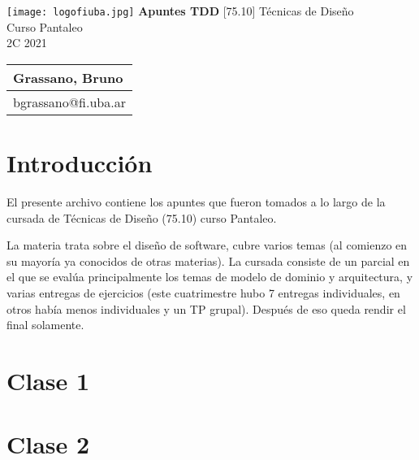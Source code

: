 \documentclass[titlepage,a4paper]{article}
\begin{document}
\begin{titlepage} %
	\hfill\texttt{[image: logofiuba.jpg]}
    \centering
    \vfill
    \Huge \textbf{Apuntes TDD}
    \vskip2cm
    \Large [75.10] Técnicas de Diseño\\
    Curso Pantaleo \\
    2C 2021 
    \vfill
    \begin{tabular}{ | l | } %
      \hline
      Grassano, Bruno \\ \hline
      bgrassano@fi.uba.ar \\ \hline
  	\end{tabular}
    \vfill
    \vfill
\end{titlepage}

\tableofcontents %

\newpage

\section{Introducción}\label{sec:intro}
El presente archivo contiene los apuntes que fueron tomados a lo largo de la cursada de Técnicas de Diseño (75.10) curso Pantaleo.

La materia trata sobre el diseño de software, cubre varios temas (al comienzo en su mayoría ya conocidos de otras materias). La cursada consiste de un parcial en el que se evalúa principalmente los temas de modelo de dominio y arquitectura, y varias entregas de ejercicios (este cuatrimestre hubo 7 entregas individuales, en otros había menos individuales y un TP grupal). Después de eso queda rendir el final solamente.


\newpage

\section*{Clase 1}

\newpage

\section*{Clase 2}

\newpage
\end{document}
